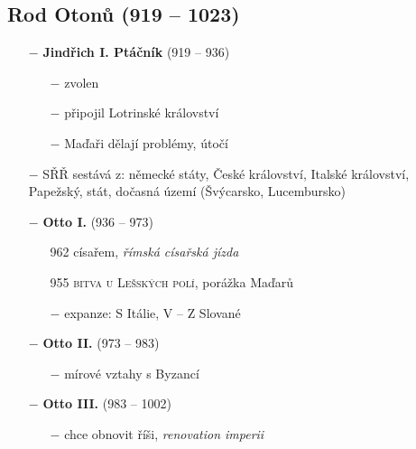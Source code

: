 \documentclass{article}
\begin{document}
\begin{minipage}{0.6\textwidth}
    \subsection*{Rod Otonů (919 -- 1023)}
    \begin{itemize}
        \vspace{-0.5em}
        \setlength\itemsep{0.15em}
        \item[$-$] \textbf{Jindřich I. Ptáčník} (919 -- 936)
            \begin{itemize}
                \vspace{-0.5em}
                \setlength\itemsep{0.15em}
                \item[$-$] zvolen
                \item[$-$] připojil Lotrinské království
                \item[$-$] Maďaři dělají problémy, útočí
            \end{itemize}
        \item[$-$] SŘŘ sestává z: německé státy, České království, Italské království, Papežský, stát, dočasná území (Švýcarsko, Lucembursko)
        \item[$-$] \textbf{Otto I.} (936 -- 973)
            \begin{itemize}
                \vspace{-0.5em}
                \setlength\itemsep{0.15em}
                \item[962] císařem, \textit{římská císařská jízda}
                \item[955] \textsc{bitva u Lešských polí}, porážka Maďarů
                \item[$-$] expanze: S Itálie, V -- Z Slované
            \end{itemize}
        \item[$-$] \textbf{Otto II.} (973 -- 983)
            \begin{itemize}
                \vspace{-0.5em}
                \setlength\itemsep{0.15em}
                \item[$-$] mírové vztahy s Byzancí
            \end{itemize}
        \item[$-$] \textbf{Otto III.} (983 -- 1002)
            \begin{itemize}
                \vspace{-0.5em}
                \setlength\itemsep{0.15em}
                \item[$-$] chce obnovit říši, \textit{renovation imperii}

\end{itemize}
\end{itemize}
\end{minipage}
\end{document}
